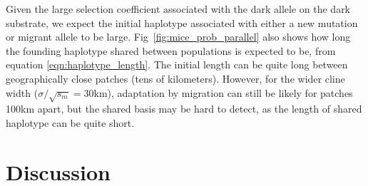 \documentclass{article}
\newcommand{\gc}[1]{{\it\color{green}(#1)} }
\begin{document}
Given the large selection coefficient associated with the dark allele
on the dark substrate, we expect the initial haplotype associated with
either a new mutation or migrant allele to be large. 
Fig~\ref{fig:mice_prob_parallel} also shows how long the founding haplotype 
shared between populations is expected to be,
from equation \eqref{eqn:haplotype_length}.
The initial length can be quite long between geographically close patches (tens of kilometers). 
However, for the wider cline width ($\sigma/\sqrt{s_m} = 30$km), 
adaptation by migration can still be likely for patches 100km apart, 
but the shared basis may be hard to detect, as the length of shared haplotype can be quite short. 



\section*{Discussion} 
\label{ss:discussion}
\end{document}
